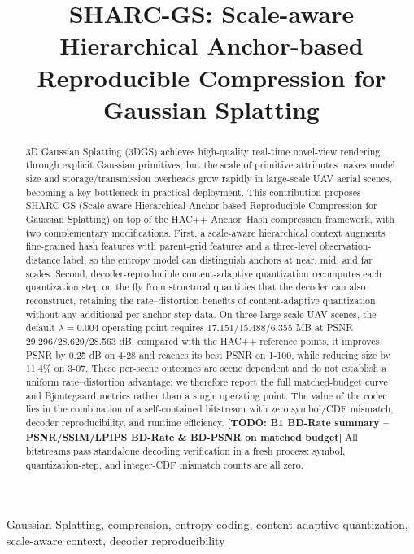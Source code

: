 \documentclass[conference]{IEEEtran}
\begin{document}
\title{SHARC-GS: Scale-aware Hierarchical Anchor-based Reproducible
Compression for Gaussian Splatting}



\maketitle

\begin{abstract}
3D Gaussian Splatting (3DGS) achieves high-quality real-time novel-view
rendering through explicit Gaussian primitives, but the scale of
primitive attributes makes model size and storage/transmission overheads
grow rapidly in large-scale UAV aerial scenes, becoming a key bottleneck
in practical deployment. This contribution proposes SHARC-GS (Scale-aware
Hierarchical Anchor-based Reproducible Compression for Gaussian
Splatting) on top of the HAC++ Anchor--Hash compression framework, with
two complementary modifications. First, a scale-aware hierarchical
context augments fine-grained hash features with parent-grid features
and a three-level observation-distance label, so the entropy model can
distinguish anchors at near, mid, and far scales. Second,
decoder-reproducible content-adaptive quantization recomputes each
quantization step on the fly from structural quantities that the decoder
can also reconstruct, retaining the rate--distortion benefits of
content-adaptive quantization without any additional per-anchor step
data. On three large-scale UAV scenes, the default $\lambda=0.004$
operating point requires 17.151/15.488/6.355 MB at PSNR
29.296/28.629/28.563 dB; compared with the HAC++ reference points, it
improves PSNR by 0.25 dB on 4-28 and reaches its best PSNR on 1-100,
while reducing size by 11.4\% on 3-07. These per-scene outcomes are
scene dependent and do not establish a uniform rate--distortion
advantage; we therefore report the full matched-budget curve and
Bjontegaard metrics rather than a single operating point. The value of
the codec lies in the combination of a self-contained bitstream with
zero symbol/CDF mismatch, decoder reproducibility, and runtime
efficiency.
\textbf{[TODO: B1 BD-Rate summary -- PSNR/SSIM/LPIPS BD-Rate \& BD-PSNR on
matched budget]}
All bitstreams pass standalone decoding verification in a fresh process:
symbol, quantization-step, and integer-CDF mismatch counts are all zero.
\end{abstract}

\begin{IEEEkeywords}
Gaussian Splatting, compression, entropy coding, content-adaptive
quantization, scale-aware context, decoder reproducibility
\end{IEEEkeywords}
\end{document}
